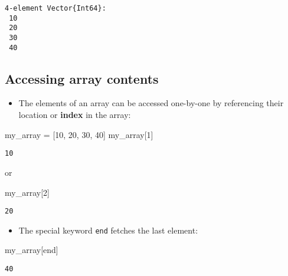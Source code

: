 \documentclass[
  letterpaper,
  DIV=11,
  numbers=noendperiod]{scrartcl}
\newenvironment{Shaded}{\begin{snugshade}}{\end{snugshade}}
\newcommand{\FloatTok}[1]{\textcolor[rgb]{0.68,0.00,0.00}{#1}}
\newcommand{\KeywordTok}[1]{\textcolor[rgb]{0.00,0.23,0.31}{#1}}
\newcommand{\NormalTok}[1]{\textcolor[rgb]{0.00,0.23,0.31}{#1}}
\newcommand{\OperatorTok}[1]{\textcolor[rgb]{0.37,0.37,0.37}{#1}}
\providecommand{\tightlist}{%
  \setlength{\itemsep}{0pt}\setlength{\parskip}{0pt}}\usepackage{longtable,booktabs,array}
\begin{document}
\begin{verbatim}
4-element Vector{Int64}:
 10
 20
 30
 40
\end{verbatim}

\subsection{Accessing array contents}\label{accessing-array-contents}

\begin{itemize}
\tightlist
\item
  The elements of an array can be accessed one-by-one by referencing
  their location or \textbf{index} in the array:
\end{itemize}

\begin{Shaded}
\begin{Highlighting}[]
\NormalTok{my\_array }\OperatorTok{=}\NormalTok{ [}\FloatTok{10}\NormalTok{, }\FloatTok{20}\NormalTok{, }\FloatTok{30}\NormalTok{, }\FloatTok{40}\NormalTok{]}
\NormalTok{my\_array[}\FloatTok{1}\NormalTok{]}
\end{Highlighting}
\end{Shaded}

\begin{verbatim}
10
\end{verbatim}

or

\begin{Shaded}
\begin{Highlighting}[]
\NormalTok{my\_array[}\FloatTok{2}\NormalTok{]}
\end{Highlighting}
\end{Shaded}

\begin{verbatim}
20
\end{verbatim}

\begin{itemize}
\tightlist
\item
  The special keyword \texttt{end} fetches the last element:
\end{itemize}

\begin{Shaded}
\begin{Highlighting}[]
\NormalTok{my\_array[}\KeywordTok{end}\NormalTok{]}
\end{Highlighting}
\end{Shaded}

\begin{verbatim}
40
\end{verbatim}
\end{document}

